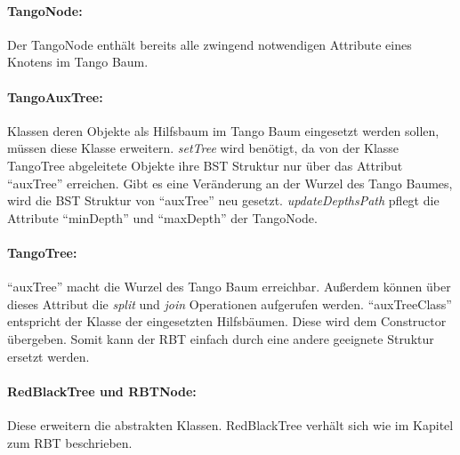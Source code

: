 \documentclass[a4paper,12pt]{article}
\begin{document}
\paragraph{TangoNode:}
Der TangoNode enthält bereits alle zwingend notwendigen Attribute eines Knotens im Tango Baum. 

\paragraph{TangoAuxTree:}
Klassen deren Objekte als Hilfsbaum im Tango Baum eingesetzt werden sollen, müssen diese Klasse erweitern. \textit{setTree} wird benötigt, da von der Klasse TangoTree abgeleitete Objekte ihre BST Struktur nur über das Attribut \enquote{auxTree} erreichen. Gibt es eine Veränderung an der Wurzel des Tango Baumes, wird die BST Struktur von \enquote{auxTree} neu gesetzt. \textit{updateDepthsPath} pflegt die Attribute \enquote{minDepth} und \enquote{maxDepth} der TangoNode.

\paragraph{TangoTree:}
\enquote{auxTree} macht die Wurzel des Tango Baum erreichbar. Außerdem können über dieses Attribut die \textit{split} und \textit{join} Operationen aufgerufen werden. \enquote{auxTreeClass} entspricht der Klasse der eingesetzten Hilfsbäumen. Diese wird dem Constructor übergeben. Somit kann der RBT einfach durch eine andere geeignete Struktur ersetzt werden.

\paragraph{RedBlackTree und RBTNode:}
Diese erweitern die abstrakten Klassen. RedBlackTree verhält sich wie im Kapitel zum RBT beschrieben. 
\end{document}
